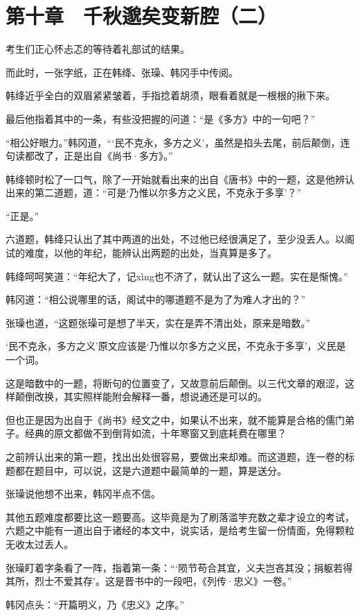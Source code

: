 \section{第十章　千秋邈矣变新腔（二）}

考生们正心怀忐忑的等待着礼部试的结果。

而此时，一张字纸，正在韩绛、张璪、韩冈手中传阅。

韩绛近乎全白的双眉紧紧皱着，手指捻着胡须，眼看着就是一根根的揪下来。

最后他指着其中的一条，有些没把握的问道：“是《多方》中的一句吧？”

“相公好眼力。”韩冈道，“‘民不克永，多方之义’，虽然是掐头去尾，前后颠倒，连句读都改了，正是出自《尚书·多方》。”

韩绛顿时松了一口气，除了一开始就看出来的出自《唐书》中的一题，这是他辨认出来的第二道题，道：“可是‘乃惟以尔多方之义民，不克永于多享’？”

“正是。”

六道题，韩绛只认出了其中两道的出处，不过他已经很满足了，至少没丢人。以阁试的难度，以他的年纪，能辨认出两题的出处，当真算是多了。

韩绛呵呵笑道：“年纪大了，记xìng也不济了，就认出了这么一题。实在是惭愧。”

韩冈道：“相公说哪里的话，阁试中的哪道题不是为了为难人才出的？”

张璪也道，“这题张璪可是想了半天，实在是弄不清出处，原来是暗数。”

‘民不克永，多方之义’原文应该是‘乃惟以尔多方之义民，不克永于多享’，义民是一个词。

这是暗数中的一题，将断句的位置变了，又故意前后颠倒。以三代文章的艰涩，这样颠倒改换，其实照样能附会解释一番，想说通还是可以的。

但也正是因为出自于《尚书》经文之中，如果认不出来，就不能算是合格的儒门弟子。经典的原文都做不到倒背如流，十年寒窗又到底耗费在哪里？

之前辨认出来的第一题，找出出处很容易，要做出来却难。而这道题，连一卷的标题都在题目中，可以说，这是六道题中最简单的一题，算是送分。

张璪说他想不出来，韩冈半点不信。

其他五题难度都要比这一题要高。这毕竟是为了刷落滥竽充数之辈才设立的考试，六题之中能有一道出自于诸经的本文中，说实话，是给考生留一份情面，免得颗粒无收太过丢人。

张璪盯着字条看了一阵，指着第一条：“‘陨节苟合其宜，义夫岂吝其没；捐躯若得其所，烈士不爱其存’。这是晋书中的一段吧，《列传·忠义》一卷。”

韩冈点头：“开篇明义，乃《忠义》之序。”

